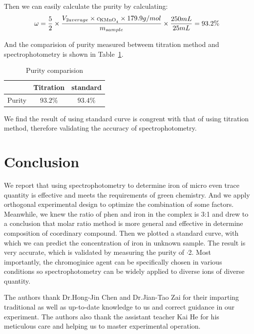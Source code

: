 \documentclass[journal=jacsat,manuscript=article]{achemso}
\begin{document}
Then we can easily calculate the purity by calculating: \[\omega=\frac{5}{2}\times\frac{V_{2average}\times c_{\ce{KMnO4}}\times179.9 g/mol}{m_{sample}}\times\frac{250mL}{25mL}=93.2\%\]

And the comparision of purity measured betweem titration method and spectrophotometry is shown in Table~\ref{tab.Res}.

\begin{table}[H]
    \caption{Purity comparision}
    \label{tab.Res}
    \begin{tabular}{ccc}
    \toprule
           & Titration & standard\\
    \midrule
    Purity & $93.2\%$  & $93.4\%$   \\
    \bottomrule
    \end{tabular}
\end{table}

We find the result of using standard curve is congrent with that of using titration method, therefore validating the accuracy of spectrophotometry.



\section{Conclusion}
We report that using spectrophotometry to determine iron of micro even trace quantity is effective and meets the requirements of green chemistry. And we apply orthogonal experimental design to optimize the combination of some factors. Meanwhile, we knew the ratio of phen and iron in the complex is 3:1 and drew to a conclusion that molar ratio method is more general and effective in determine composition of coordinary compound. Then we plotted a standard curve, with which we can predict the concentration of iron in unknown sample. The result is very accurate, which is validated by measuring the purity of $\cdot$2. Most importantly, the chromoginice agent can be specifically chosen in various conditions so spectrophotometry can be widely applied to diverse ions of diverse quantity.



\begin{acknowledgement}

The authors thank Dr.Hong-Jin Chen and Dr.Jian-Tao Zai for their imparting traditional as well as up-to-date knowledge to us and correct guidance in our experiment. The authors also thank the assistant teacher Kai He for his meticulous care and helping us to master experimental operation.

\end{acknowledgement}


\end{document}
